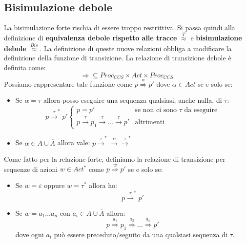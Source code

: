 \subsection{Bisimulazione debole}
La bisimulazione forte rischia di essere troppo restrittiva. Si passa quindi alla
definizione di \textbf{equivalenza debole rispetto alle tracce} $\stackrel{T}{\approx}$
e \textbf{bisimulazione debole} $\stackrel{Bis}{\approx}$.
La definizione di queste nuove relazioni obbliga a modificare la definizione
della funzione di transizione. La relazione di transizione debole è definita come:
\begin{equation}
    \Rightarrow \subseteq Proc_{CCS} \times Act \times Proc_{CCS}
\end{equation}
Possiamo rappresentare tale funzione come $p \stackrel{\alpha}{\Rightarrow} p'$ dove
$\alpha \in Act$ se e solo se:
\begin{itemize}
    \item Se $\alpha = \tau$ allora posso eseguire una sequenza qualsiasi, anche
          nulla, di $\tau$:
          \begin{equation}
              p \xrightarrow{\tau}^{\ast} p'\begin{cases}
                  p = p'
                                        & \text{se non ci sono } \tau \text{ da eseguire} \\
                  p \xrightarrow{\tau} p_1 \xrightarrow{\tau} \dots
                  \xrightarrow{\tau} p' & \text{altrimenti}
              \end{cases}
          \end{equation}
    \item Se $\alpha \in A \cup \overline{A}$ allora vale:
          $p \xrightarrow{\tau}^{\ast} \xrightarrow{\alpha} \xrightarrow{\tau}^{\ast}$
\end{itemize}
Come fatto per la relazione forte, definiamo la relazione di transizione per
sequenze di azioni $w \in Act^{\ast}$ come $p \stackrel{w}{\Rightarrow} p'$ se e solo se:
\begin{itemize}
    \item Se $w = \varepsilon$ oppure $w = \tau^{\ast}$ allora ho:
          \begin{equation}
              p \xrightarrow{\tau}^{\ast} p'
          \end{equation}
    \item Se $w = a_1\dots a_n$ con $a_i \in A \cup \overline{A}$ allora:
          \begin{equation}
              p \stackrel{a_1}{\Rightarrow} p_1 \stackrel{a_2}{\Rightarrow} \dots
              \stackrel{a_n}{\Rightarrow} p'
          \end{equation}
          dove ogni $a_i$ può essere preceduto/seguito da una qualsiasi sequenza
          di $\tau$.
\end{itemize}

